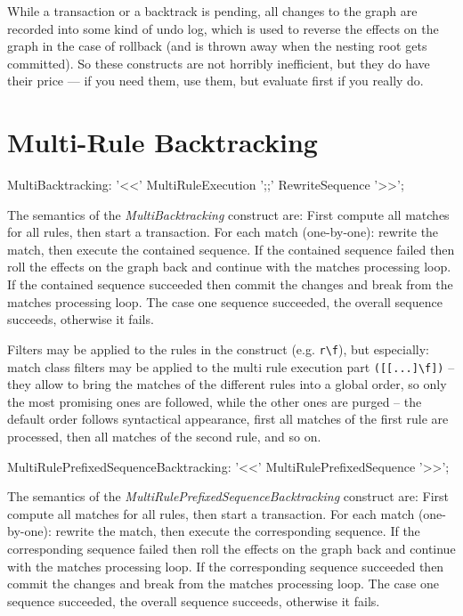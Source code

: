 \begin{note}
While a transaction or a backtrack is pending, all changes to the graph are recorded into some kind of undo log, which is used to reverse the effects on the graph in the case of rollback (and is thrown away when the nesting root gets committed).
So these constructs are not horribly inefficient, but they do have their price --- if you need them, use them, but evaluate first if you really do.
\end{note}


\section{Multi-Rule Backtracking}\label{sec:multitransaction}

\begin{rail}
  MultiBacktracking: '<<' MultiRuleExecution ';;' RewriteSequence '>>';
\end{rail}

The semantics of the \emph{MultiBacktracking} construct are:
First compute all matches for all rules, then start a transaction.
For each match (one-by-one): rewrite the match, then execute the contained sequence.
If the contained sequence failed then roll the effects on the graph back and continue with the matches processing loop.
If the contained sequence succeeded then commit the changes and break from the matches processing loop.
The case one sequence succeeded, the overall sequence succeeds, otherwise it fails.

Filters may be applied to the rules in the construct (e.g. \verb#r\f#), but especially: match class filters may be applied to the multi rule execution part \verb#([[...]\f])# -- they allow to bring the matches of the different rules into a global order, so only the most promising ones are followed, while the other ones are purged -- the default order follows syntactical appearance, first all matches of the first rule are processed, then all matches of the second rule, and so on.

\begin{rail}
  MultiRulePrefixedSequenceBacktracking: '<<' MultiRulePrefixedSequence '>>';
\end{rail}

The semantics of the \emph{MultiRulePrefixedSequenceBacktracking} construct are:
First compute all matches for all rules, then start a transaction.
For each match (one-by-one): rewrite the match, then execute the corresponding sequence.
If the corresponding sequence failed then roll the effects on the graph back and continue with the matches processing loop.
If the corresponding sequence succeeded then commit the changes and break from the matches processing loop.
The case one sequence succeeded, the overall sequence succeeds, otherwise it fails.

